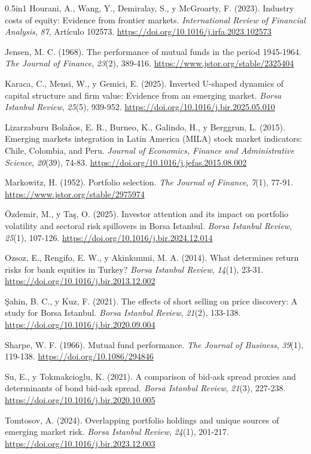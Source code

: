 \documentclass[12pt]{article}
\begin{document}
{\begin{hangparas}{0.5in}{1}
Hourani, A., Wang, Y., Demiralay, S., y McGroarty, F. (2023). Industry costs of equity: Evidence from frontier markets. \textit{International Review of Financial Analysis}, \textit{87}, Artículo 102573. \url{https://doi.org/10.1016/j.irfa.2023.102573}

Jensen, M. C. (1968). The performance of mutual funds in the period 1945-1964. \textit{The Journal of Finance}, \textit{23}(2), 389-416. \url{https://www.jstor.org/stable/2325404}

Karaca, C., Mensi, W., y Gemici, E. (2025). Inverted U-shaped dynamics of capital structure and firm value: Evidence from an emerging market. \textit{Borsa Istanbul Review}, \textit{25}(5), 939-952. \url{https://doi.org/10.1016/j.bir.2025.05.010}

Lizarzaburu Bolaños, E. R., Burneo, K., Galindo, H., y Berggrun, L. (2015). Emerging markets integration in Latin America (MILA) stock market indicators: Chile, Colombia, and Peru. \textit{Journal of Economics, Finance and Administrative Science}, \textit{20}(39), 74-83. \url{https://doi.org/10.1016/j.jefas.2015.08.002}

Markowitz, H. (1952). Portfolio selection. \textit{The Journal of Finance}, \textit{7}(1), 77-91. \url{https://www.jstor.org/stable/2975974}

Özdemir, M., y Taş, O. (2025). Investor attention and its impact on portfolio volatility and sectoral risk spillovers in Borsa Istanbul. \textit{Borsa Istanbul Review}, \textit{25}(1), 107-126. \url{https://doi.org/10.1016/j.bir.2024.12.014}

Ozsoz, E., Rengifo, E. W., y Akinkunmi, M. A. (2014). What determines return risks for bank equities in Turkey? \textit{Borsa Istanbul Review}, \textit{14}(1), 23-31. \url{https://doi.org/10.1016/j.bir.2013.12.002}

Şahin, B. C., y Kuz, F. (2021). The effects of short selling on price discovery: A study for Borsa Istanbul. \textit{Borsa Istanbul Review}, \textit{21}(2), 133-138. \url{https://doi.org/10.1016/j.bir.2020.09.004}

Sharpe, W. F. (1966). Mutual fund performance. \textit{The Journal of Business}, \textit{39}(1), 119-138. \url{https://doi.org/10.1086/294846}

Su, E., y Tokmakcioglu, K. (2021). A comparison of bid-ask spread proxies and determinants of bond bid-ask spread. \textit{Borsa Istanbul Review}, \textit{21}(3), 227-238. \url{https://doi.org/10.1016/j.bir.2020.10.005}

Tomtosov, A. (2024). Overlapping portfolio holdings and unique sources of emerging market risk. \textit{Borsa Istanbul Review}, \textit{24}(1), 201-217. \url{https://doi.org/10.1016/j.bir.2023.12.003}


\end{hangparas}}
\end{document}

